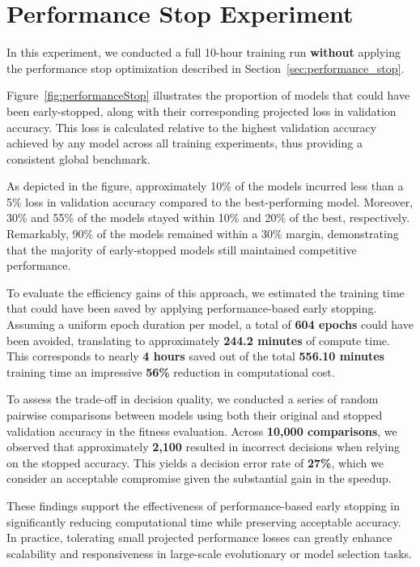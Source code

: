 \section{Performance Stop Experiment}
In this experiment, we conducted a full 10-hour training run \textbf{without} applying the performance stop optimization described in Section~\ref{sec:performance_stop}.

Figure~\ref{fig:performanceStop} illustrates the proportion of models that could have been early-stopped, along with their corresponding projected loss in validation accuracy. This loss is calculated relative to the highest validation accuracy achieved by any model across all training experiments, thus providing a consistent global benchmark.

As depicted in the figure, approximately 10\% of the models incurred less than a 5\% loss in validation accuracy compared to the best-performing model. Moreover, 30\% and 55\% of the models stayed within 10\% and 20\% of the best, respectively. Remarkably, 90\% of the models remained within a 30\% margin, demonstrating that the majority of early-stopped models still maintained competitive performance.

To evaluate the efficiency gains of this approach, we estimated the training time that could have been saved by applying performance-based early stopping. Assuming a uniform epoch duration per model, a total of \textbf{604 epochs} could have been avoided, translating to approximately \textbf{244.2 minutes} of compute time. This corresponds to nearly \textbf{4 hours} saved out of the total \textbf{556.10 minutes} training time an impressive \textbf{56\%} reduction in computational cost.

To assess the trade-off in decision quality, we conducted a series of random pairwise comparisons between models using both their original and stopped validation accuracy in the fitness evaluation. Across \textbf{10,000 comparisons}, we observed that approximately \textbf{2,100} resulted in incorrect decisions when relying on the stopped accuracy. This yields a decision error rate of \textbf{27\%}, which we consider an acceptable compromise given the substantial gain in the speedup.

These findings support the effectiveness of performance-based early stopping in significantly reducing computational time while preserving acceptable accuracy. In practice, tolerating small projected performance losses can greatly enhance scalability and responsiveness in large-scale evolutionary or model selection tasks.


